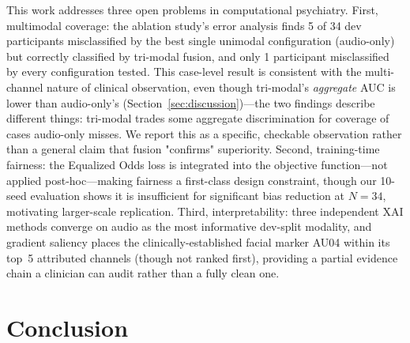 \documentclass[5p,twocolumn]{elsarticle}
\begin{document}
This work addresses three open problems in computational psychiatry.
First, multimodal coverage: the ablation study's error analysis finds
5 of 34 dev participants misclassified by the best single unimodal
configuration (audio-only) but correctly classified by tri-modal
fusion, and only 1 participant misclassified by every configuration
tested. This case-level result is consistent with the multi-channel
nature of clinical observation, even though tri-modal's \emph{aggregate}
AUC is lower than audio-only's (Section~\ref{sec:discussion})---the two
findings describe different things: tri-modal trades some aggregate
discrimination for coverage of cases audio-only misses. We report
this as a specific, checkable observation rather than a general claim
that fusion "confirms" superiority. Second, training-time fairness: the
Equalized Odds loss is integrated into the objective function---not
applied post-hoc---making fairness a first-class design constraint,
though our 10-seed evaluation shows it is insufficient for significant
bias reduction at $N{=}34$, motivating larger-scale replication.
Third, interpretability: three independent XAI methods converge on
audio as the most informative dev-split modality, and gradient
saliency places the clinically-established facial marker AU04 within
its top~5 attributed channels (though not ranked first), providing a
partial evidence chain a clinician can audit rather than a fully
clean one.

\section{Conclusion}
\label{sec:conclusion}
\end{document}

